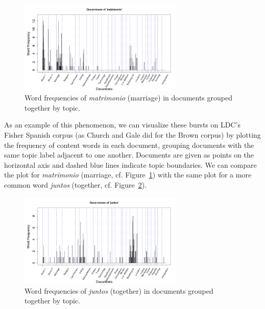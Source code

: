 \begin{figure}[t]
\begin{center}
\includegraphics[width=0.7\textwidth]{graphs/freq-matrimonio.png}
\caption[Word frequencies of \textit{matrimonio} by topic]{Word frequencies of \textit{matrimonio} (marriage) in documents grouped together by topic.\label{spanishBursts}}
\end{center}
\end{figure}

As an example of this phenomenon, we can visualize these bursts on LDC's Fisher Spanish corpus (as Church and Gale did for the Brown corpus) by plotting the frequency of content words in each document, grouping documents with the same topic label adjacent to one another.  Documents are given as points on the horizontal axis and dashed blue lines indicate topic boundaries.  We can compare the plot for \textit{matrimonio} (marriage, cf. Figure~\ref{spanishBursts}) with the same plot for a more common word \textit{juntos} (together, cf. Figure~\ref{spanishBurst2}).  


\begin{figure}[t]
\begin{center}
\includegraphics[width=0.7\textwidth]{graphs/freq-juntos.png}
\caption[Word frequencies of \textit{juntos} by topic]{Word frequencies of \textit{juntos} (together) in documents grouped together by topic.\label{spanishBurst2}}
\end{center}
\end{figure}

